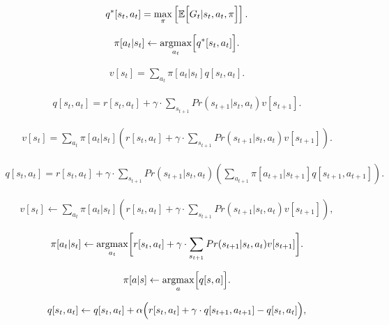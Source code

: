 \documentclass[letterpaper,twoside,openany, titlepage,oldfontcommands,titles,dvipsnames]{memoir}
\begin{document}
\begin{eqnarray}
 q^*[s_t,a_t] = \max_{\pi}\left[\mathbb{E}\Bigl[G_{t}|s_{t},a_{t},\pi \Bigr]\right].
 \end{eqnarray}

\begin{eqnarray}\label{eq:reinforce_optimal_policy}
 \pi[a_{t}|s_{t}] \leftarrow \mathop{\rm argmax}_{a_{t}}\Bigl[q^*[s_t,a_t]\Bigr].
 \end{eqnarray}

\begin{eqnarray}\label{eq:reinforce_state_ito_action}
 v[s_{t}] = \sum_{a_t} \pi[a_t|s_t]q[s_t,a_t].
 \end{eqnarray}

\begin{eqnarray}\label{eq:reinforce_action_ito_state}
 q[s_{t},a_t] = r[s_t,a_t] + \gamma \cdot \sum_{s_{t+1}} Pr(s_{t+1}|s_{t},a_{t})v[s_{t+1}].
 \end{eqnarray}

\begin{eqnarray}\label{eq:reinforce_bellman_value}
 v[s_{t}] = \sum_{a_t} \pi[a_t|s_t]
 \left(r[s_t,a_t] + \gamma \cdot \sum_{s_{t+1}} Pr(s_{t+1}|s_{t},a_{t})v[s_{t+1}]
 \right).
 \end{eqnarray}

\begin{eqnarray}\label{eq:reinforce_bellman_action}
 q[s_{t},a_t] = r[s_t,a_t] + \gamma \cdot \sum_{s_{t+1}} Pr(s_{t+1}|s_{t},a_{t})\left(\sum_{a_{t+1}} \pi[a_{t+1}|s_{t+1}]q[s_{t+1},a_{t+1}]\right).
 \end{eqnarray}


\begin{eqnarray}\label{eq:reinforce_dp1}
 v[s_t]\leftarrow \sum_{a_t} \pi[a_t|s_t]\left(r[s_t,a_t]+\gamma \cdot\sum_{s_{t+1}}Pr(s_{t+1}|s_{t},a_t) v[s_{t+1}]\right),
 \end{eqnarray}

\begin{eqnarray}\label{eq:reinforce_dp2}
 \pi[a_t|s_t] \leftarrow \mathop{\rm argmax}_{a_t}\biggl[r[s_t,a_t]+\gamma \cdot \sum_{s_{t+1}} Pr(s_{t+1}|s_t,a_t)v[s_{t+1}]\biggr].
 \end{eqnarray}


\begin{eqnarray}\label{eq:reinforce:MC_policy_update}
 \pi[a|s] \leftarrow \mathop{\rm argmax}_{a}\Bigl[q[s,a]\Bigr].
 \end{eqnarray}

\begin{eqnarray}\label{eq:reinforce_sarsa}
 q[s_t,a_t] \leftarrow q[s_t,a_t] + \alpha \Bigl(r[s_t,a_t]+\gamma \cdot q[s_{t+1},a_{t+1}] - q[s_t,a_t]\Bigr),
 \end{eqnarray}
\end{document}

